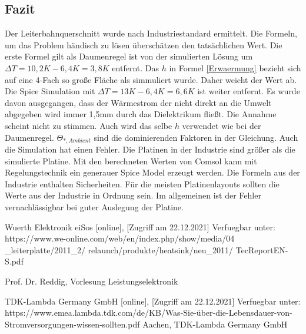 \documentclass[10pt,a4paper,oneside,abstracton]{scrartcl}
\begin{document}
\begin{multicols}{2}
\section{Fazit}
Der Leiterbahnquerschnitt wurde nach Industriestandard ermittelt. 
Die Formeln, um das Problem händisch zu lösen überschätzen den tatsächlichen Wert. 
\newline
Die erste Formel gilt als Daumenregel ist von der simulierten Lösung um $\Delta T = 10,2K - 6,4K = 3,8K$ entfernt. \newline
Das $h $ in Formel \ref*{Erwaermung} bezieht sich auf eine 4-Fach so große Fläche als simmuliert wurde. Daher weicht der Wert ab. \newline
Die Spice Simulation mit $\Delta T = 13K - 6,4K = 6,6 K$ ist weiter entfernt.  \newline
Es wurde davon ausgegangen, dass der Wärmestrom der nicht direkt an die Umwelt abgegeben wird \newline
immer 1,5mm durch das Dielektrikum fließt. Die Annahme scheint nicht zu stimmen. Auch wird das selbe  $h $ verwendet wie bei der Daumenregel. \newline
$ \Theta_{*, Ambient} $ sind die dominierenden Faktoren in der Gleichung.  \newline
Auch die Simulation hat einen Fehler. 
Die Platinen in der Industrie sind größer als die simulierte Platine.
Mit den berechneten Werten von Comsol kann mit Regelungstechnik ein generauer Spice Model erzeugt werden.  \newline
Die Formeln aus der Industrie enthalten Sicherheiten.
Für die meisten Platinenlayouts sollten die Werte aus der Industrie in Ordnung sein. 
Im allgemeinen ist der Fehler vernachlässigbar bei guter Auslegung der Platine. 
\noindent
\begin{thebibliography}{9}

Wuerth Elektronik eiSos  [online], [Zugriff am 22.12.2021] Verfuegbar unter:
 https://www.we-online.com/web/en/index.php/show/media/04
 \_leiterplatte/2011\_2/ relaunch/produkte/heatsink/neu\_2011/
 TecReport\-EN-S.pdf

Prof. Dr. Reddig, Vorlesung Leistungselektronik

TDK-Lambda Germany GmbH [online], [Zugriff am 22.12.2021] Verfuegbar unter:	https://www.emea.lambda.tdk.com/de/KB/Was-Sie-über-die-Lebensdauer-von-Stromversorgungen-wissen-sollten.pdf
Aachen, TDK-Lambda Germany GmbH




\end{thebibliography}
\end{multicols}
\end{document}
